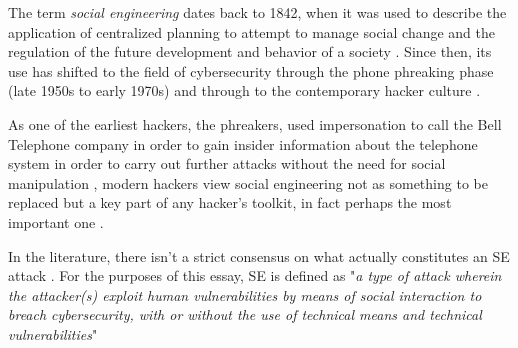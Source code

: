The term \textit{social engineering} dates back to 1842, when it was used to describe the application of centralized planning to attempt to manage social change and the regulation of the future development and behavior of a society \citep{hatfieldSocialEngineeringCybersecurity2018a}. Since then, its use has shifted to the field of cybersecurity through the phone phreaking phase (late 1950s to early 1970s) and through to the contemporary hacker culture \citep{wangDefiningSocialEngineering2020}.

As one of the earliest hackers, the phreakers, used impersonation to call the Bell Telephone company in order to gain insider information about the telephone system in order to carry out further attacks without the need for social manipulation \citep{hatfieldSocialEngineeringCybersecurity2018a}, modern hackers view social engineering not as something to be replaced but a key part of any hacker's toolkit, in fact perhaps the most important one \citep{mitnickArtDeceptionControlling2003}.



In the literature, there isn't a strict consensus on what actually constitutes an SE attack \citep{hatfieldSocialEngineeringCybersecurity2018a}. For the purposes of this essay, SE is defined as "\textit{a type of attack wherein the attacker(s) exploit human vulnerabilities by means of social interaction to breach cybersecurity, with or without the use of technical means and technical vulnerabilities}" \citep{wangDefiningSocialEngineering2020}


